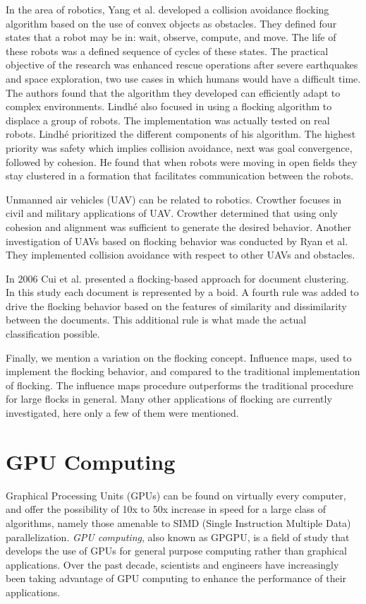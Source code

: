 In the area of robotics, Yang et al. developed a collision avoidance flocking algorithm based on the use of convex objects as obstacles\cite{flockingRobots}. They defined four states that a robot may be in: wait, observe, compute, and move. The life of these robots was a defined sequence of cycles of these states. The practical objective of the research was enhanced rescue operations after severe earthquakes and space exploration, two use cases in which humans would have a difficult time. The authors found that the algorithm they developed can efficiently adapt to complex environments. Lindh\'{e} also focused in using a flocking algorithm to displace a group of robots\cite{flockingRobotsThesis}. The implementation was actually tested on real robots. Lindh\'{e} prioritized the different components of his algorithm. The highest priority was safety which implies collision avoidance, next was goal convergence, followed by cohesion. He found that when robots were moving in open fields they stay clustered in a formation that facilitates communication between the robots. 

Unmanned air vehicles (UAV) can be related to robotics. Crowther focuses in civil and military applications of  UAV\cite{flockingUAV}. Crowther determined that using only cohesion and alignment was sufficient to generate the desired behavior. Another investigation of UAVs based on flocking behavior was conducted by Ryan et al\cite{UAVControl}. They implemented collision avoidance with respect to other UAVs and obstacles. 

In 2006 Cui et al. presented a flocking-based approach for document clustering\cite{document1}. In this study each document is represented by a boid. A fourth rule was added to drive the flocking behavior based on the features of similarity and dissimilarity between the documents. This additional rule is what made the actual classification possible. 

Finally, we mention a variation on the flocking concept.  Influence maps, used to implement the flocking behavior, and compared to the traditional implementation of flocking\cite{flockingInfluenceMaps}. The influence maps procedure outperforms the traditional procedure for large flocks in general. Many other applications of flocking are currently investigated, here only a few of them were mentioned.

\section{GPU Computing}
Graphical Processing Units (GPUs) can be found on virtually every computer, and offer the possibility of 10x to 50x increase in speed for a large class of algorithms, namely those amenable to SIMD (Single Instruction Multiple Data)  parallelization. \textit{GPU computing}, also known as GPGPU, is a field of study that develops the use of GPUs for general purpose computing rather than graphical applications. Over the past decade, scientists and engineers have increasingly been taking advantage of GPU computing to enhance the performance of their applications.

